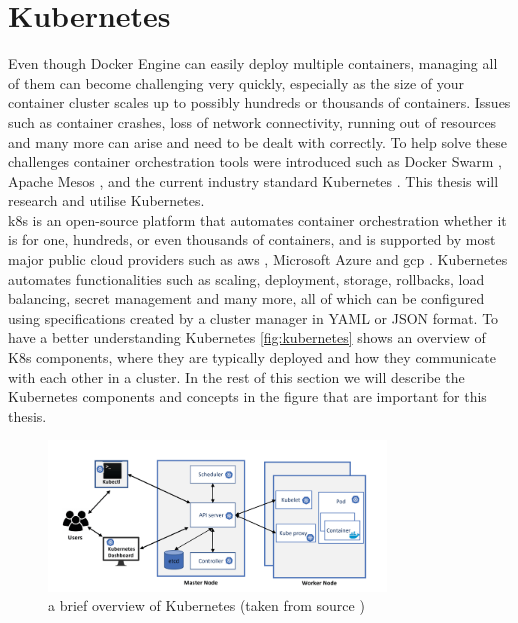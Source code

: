 \section{Kubernetes}\label{sec:kubernetes}

Even though Docker Engine can easily deploy multiple containers, managing all of them can become challenging very quickly, especially as the size of your container cluster scales up to possibly hundreds or thousands of containers. Issues such as container crashes, loss of network connectivity, running out of resources and many more can arise and need to be dealt with correctly. To help solve these challenges container orchestration tools were introduced such as Docker Swarm \cite{dockerswarm}, Apache Mesos \cite{apachemesos}, and the current industry standard Kubernetes \cite{resman} \cite{CNCFSurvey}. This thesis will research and utilise Kubernetes.
\\[10pt]

\acrfull{k8s} is an open-source platform that automates container orchestration whether it is for one, hundreds, or even thousands of containers, and is supported by most major public cloud providers such as \acrfull{aws} \cite{aws}, Microsoft Azure \cite{azure} and \acrfull{gcp} \cite{gcp}. Kubernetes automates functionalities such as scaling, deployment, storage, rollbacks, load balancing, secret management and many more, all of which can be configured using specifications created by a cluster manager in YAML or JSON format. To have a better understanding Kubernetes \autoref{fig:kubernetes} shows an overview of K8s components, where they are typically deployed and how they communicate with each other in a cluster. In the rest of this section we will describe the Kubernetes components and concepts in the figure that are important for this thesis. 
\\[10pt]
\begin{figure}[htbp]
  \centering
  \includegraphics[width=0.8\textwidth]{images/kubernetes-structure.png} 
  \caption{a brief overview of Kubernetes (taken from source \cite{IslamShamim2020a})}
  \label{fig:kubernetes}
\end{figure}

